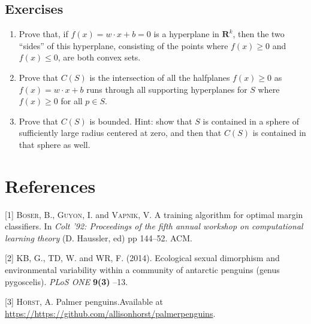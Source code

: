\documentclass[
]{article}
\newenvironment{cslreferences}%
  {}%
  {\par}
\begin{document}
\hypertarget{sec:exercises}{%
\subsection{Exercises}\label{sec:exercises}}

\begin{enumerate}
\def\labelenumi{\arabic{enumi}.}
\item
  Prove that, if \(f(x)=w\cdot x+b=0\) is a hyperplane in
  \(\mathbf{R}^{k}\), then the two ``sides'' of this hyperplane,
  consisting of the points where \(f(x)\ge 0\) and \(f(x)\le 0\), are
  both convex sets.
\item
  Prove that \(C(S)\) is the intersection of all the halfplanes
  \(f(x)\ge 0\) as \(f(x)=w\cdot x+b\) runs through all supporting
  hyperplanes for \(S\) where \(f(x)\ge 0\) for all \(p\in S\).
\item
  Prove that \(C(S)\) is bounded. Hint: show that \(S\) is contained in
  a sphere of sufficiently large radius centered at zero, and then that
  \(C(S)\) is contained in that sphere as well.
\end{enumerate}

\hypertarget{bibliography}{%
\section*{References}\label{bibliography}}

\hypertarget{refs}{}
\begin{cslreferences}
\leavevmode\hypertarget{ref-vapnik92}{}%
{[}1{]} \textsc{Boser}, B., \textsc{Guyon}, I. and \textsc{Vapnik}, V. A
training algorithm for optimal margin classifiers. In \emph{Colt '92:
Proceedings of the fifth annual workshop on computational learning
theory} (D. Haussler, ed) pp 144--52. ACM.

\leavevmode\hypertarget{ref-penguins}{}%
{[}2{]} \textsc{KB}, G., \textsc{TD}, W. and \textsc{WR}, F. (2014).
Ecological sexual dimorphism and environmental variability within a
community of antarctic penguins (genus pygoscelis). \emph{PLoS ONE}
\textbf{9(3)} --13.

\leavevmode\hypertarget{ref-penguindata}{}%
{[}3{]} \textsc{Horst}, A. Palmer penguins.Available at
\url{https://https://github.com/allisonhorst/palmerpenguins}.
\end{cslreferences}
\end{document}
